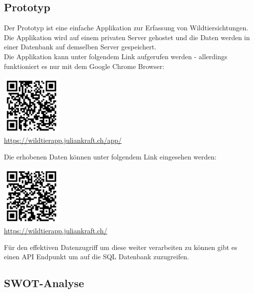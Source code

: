 \documentclass{article}
\begin{document}
\newpage

\subsection{Prototyp} %

Der Prototyp ist eine einfache Applikation zur Erfassung von Wildtiersichtungen. Die Applikation
wird auf einem privaten Server gehostet und die Daten werden in einer Datenbank auf demselben Server gespeichert.\\

Die Applikation kann unter folgendem Link aufgerufen werden - allerdings funktioniert es nur mit dem Google Chrome Browser:\\

\begin{center}

  \includegraphics[width=3cm]{qr_code_app.png}\\
  \url{https://wildtierapp.juliankraft.ch/app/}

\end{center}

Die erhobenen Daten können unter folgendem Link eingesehen werden:\\

\begin{center}

  \includegraphics[width=3cm]{qr_code_data.png}\\
  \url{https://wildtierapp.juliankraft.ch/}

\end{center}

Für den effektiven Datenzugriff um diese weiter verarbeiten zu können gibt es einen API Endpunkt um auf die SQL Datenbank zuzugreifen.


\newpage

\subsection{SWOT-Analyse} %
\end{document}
